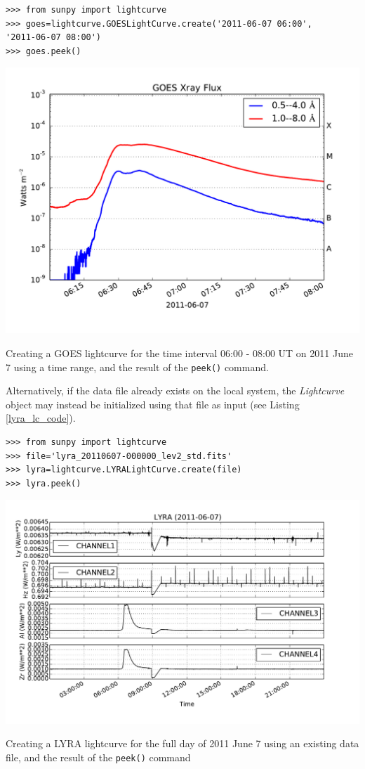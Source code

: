 \begin{listing}[H]
\begin{verbatim}
>>> from sunpy import lightcurve
>>> goes=lightcurve.GOESLightCurve.create('2011-06-07 06:00',
'2011-06-07 08:00')
>>> goes.peek()
\end{verbatim}
\includegraphics[width=14cm]{goes_lightcurve.pdf}
\label{goes_lc_code}
\caption{Creating a GOES lightcurve for the time interval 06:00 - 08:00 UT on 
2011 June 7 using a time range, and the result of the \texttt{peek()} command.}
\end{listing}

Alternatively, if the data file already exists on the local system, the 
\textit{Lightcurve} object may instead be initialized using that file as input 
(see Listing \ref{lyra_lc_code}).

\begin{listing}[H]
\begin{verbatim}
>>> from sunpy import lightcurve
>>> file='lyra_20110607-000000_lev2_std.fits'
>>> lyra=lightcurve.LYRALightCurve.create(file)
>>> lyra.peek()
\end{verbatim}
\includegraphics[width=14cm]{lyra_lightcurve.pdf}
\label{lyra_lc_code}
\caption{Creating a LYRA lightcurve for the full day of 2011 June 7 using an 
existing data file, and the result of the \texttt{peek()} command}
\end{listing}

